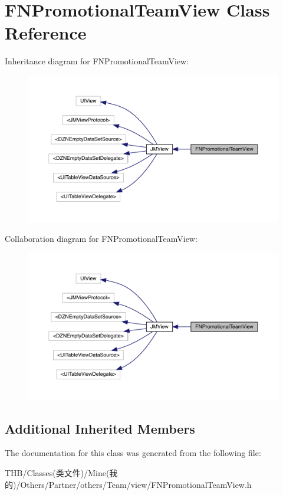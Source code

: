 \hypertarget{interface_f_n_promotional_team_view}{}\section{F\+N\+Promotional\+Team\+View Class Reference}
\label{interface_f_n_promotional_team_view}


Inheritance diagram for F\+N\+Promotional\+Team\+View\+:\nopagebreak
\begin{figure}[H]
\begin{center}
\leavevmode
\includegraphics[width=350pt]{interface_f_n_promotional_team_view__inherit__graph}
\end{center}
\end{figure}


Collaboration diagram for F\+N\+Promotional\+Team\+View\+:\nopagebreak
\begin{figure}[H]
\begin{center}
\leavevmode
\includegraphics[width=350pt]{interface_f_n_promotional_team_view__coll__graph}
\end{center}
\end{figure}
\subsection*{Additional Inherited Members}


The documentation for this class was generated from the following file\+:\begin{DoxyCompactItemize}
\item 
T\+H\+B/\+Classes(类文件)/\+Mine(我的)/\+Others/\+Partner/others/\+Team/view/F\+N\+Promotional\+Team\+View.\+h\end{DoxyCompactItemize}
